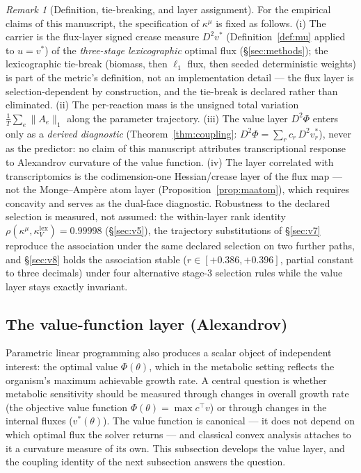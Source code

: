\documentclass[11pt,a4paper]{article}
\theoremstyle{plain}
\theoremstyle{definition}
\theoremstyle{remark}
\newtheorem{remark}[theorem]{Remark}
\newcommand{\kk}{\kappa_{\!V}}
\newcommand{\kmu}{\kappa^{\mu}}
\begin{document}
\begin{remark}[Definition, tie-breaking, and layer assignment]
\label{rem:lock}
For the empirical claims of this manuscript, the specification of
$\kmu$ is fixed as follows. (i) The carrier is the flux-layer signed crease measure
$D^2 v^*$ (Definition~\ref{def:mu} applied to $u = v^*$) of the
\emph{three-stage lexicographic} optimal flux (\S\ref{sec:methods});
the lexicographic tie-break (biomass, then $\ell_1$ flux, then seeded
deterministic weights) is part of the metric's definition, not an
implementation detail --- the flux layer is selection-dependent by
construction, and the tie-break is declared rather than eliminated.
(ii) The per-reaction mass is the unsigned total variation
$\frac{1}{T}\sum_e \|A_e\|_1$ along the parameter trajectory.
(iii) The value layer $D^2\Phi$ enters only as a \emph{derived
diagnostic} (Theorem~\ref{thm:coupling}:
$D^2\Phi = \sum_r c_r\, D^2 v^*_r$), never as the predictor: no claim
of this manuscript attributes transcriptional response to Alexandrov
curvature of the value function. (iv) The layer correlated with
transcriptomics is the codimension-one Hessian/crease layer of the
flux map --- not the Monge--Amp\`ere atom layer
(Proposition~\ref{prop:maatom}), which requires concavity and serves
as the dual-face diagnostic. Robustness to the declared selection is
measured, not assumed: the within-layer rank identity
$\rho(\kmu, \kk^{\mathrm{lex}}) = 0.99998$ (\S\ref{sec:v5}), the trajectory substitutions of \S\ref{sec:v7} reproduce the association under the same declared selection on two further paths, and \S\ref{sec:v8} holds the
association stable ($r \in [+0.386, +0.396]$, partial constant to
three decimals) under four alternative stage-3 selection rules while
the value layer stays exactly invariant.
\end{remark}

\subsection{The value-function layer (Alexandrov)}

Parametric linear programming also produces a scalar object of
independent interest: the optimal value $\Phi(\theta)$, which in the
metabolic setting reflects the organism's maximum achievable growth
rate. A central question is whether metabolic sensitivity should be
measured through changes in overall growth rate (the objective value
function $\Phi(\theta) = \max c^\top v$) or through changes in the
internal fluxes ($v^*(\theta)$). The value function is canonical ---
it does not depend on which optimal flux the solver returns --- and
classical convex analysis attaches to it a curvature measure of its
own. This subsection develops the value layer, and the coupling
identity of the next subsection answers the question.
\end{document}
